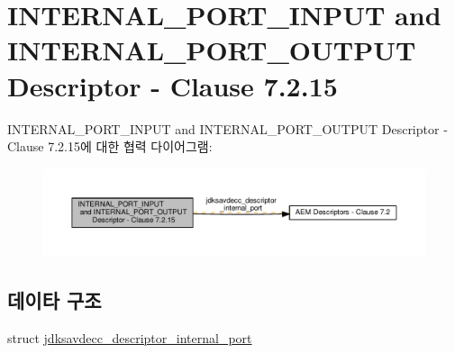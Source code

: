 \hypertarget{group__descriptor__internal__port}{}\section{I\+N\+T\+E\+R\+N\+A\+L\+\_\+\+P\+O\+R\+T\+\_\+\+I\+N\+P\+UT and I\+N\+T\+E\+R\+N\+A\+L\+\_\+\+P\+O\+R\+T\+\_\+\+O\+U\+T\+P\+UT Descriptor -\/ Clause 7.2.15}
\label{group__descriptor__internal__port}
I\+N\+T\+E\+R\+N\+A\+L\+\_\+\+P\+O\+R\+T\+\_\+\+I\+N\+P\+UT and I\+N\+T\+E\+R\+N\+A\+L\+\_\+\+P\+O\+R\+T\+\_\+\+O\+U\+T\+P\+UT Descriptor -\/ Clause 7.2.15에 대한 협력 다이어그램\+:
\nopagebreak
\begin{figure}[H]
\begin{center}
\leavevmode
\includegraphics[width=350pt]{group__descriptor__internal__port}
\end{center}
\end{figure}
\subsection*{데이타 구조}
\begin{DoxyCompactItemize}
\item 
struct \hyperlink{structjdksavdecc__descriptor__internal__port}{jdksavdecc\+\_\+descriptor\+\_\+internal\+\_\+port}
\end{DoxyCompactItemize}
